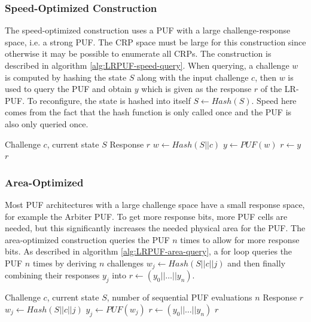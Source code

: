 \subsubsection{Speed-Optimized Construction}
The speed-optimized construction uses a PUF with a large challenge-response space, i.e. a strong PUF. The CRP space must be large for this construction since otherwise it may be possible to enumerate all CRPs. The construction is described in algorithm \ref{alg:LRPUF-speed-query}. When querying, a challenge $w$ is computed by hashing the state $S$ along with the input challenge $c$, then $w$ is used to query the PUF and obtain $y$ which is given as the response $r$ of the LR-PUF. To reconfigure, the state is hashed into itself $S\leftarrow Hash(S)$. Speed here comes from the fact that the hash function is only called once and the PUF is also only queried once. 

\begin{algorithm}[ht!]
\caption{Speed-Optimized $\texttt{query}_S(c)$}
\begin{algorithmic}[1]
    \Require Challenge $c$, current state $S$
    \Ensure Response $r$
    \State $w \leftarrow Hash(S || c)$ 
    \State $y \leftarrow PUF(w)$
    \State $r \leftarrow y$ 
    \State \Return $r$
\end{algorithmic}
\label{alg:LRPUF-speed-query}
\end{algorithm}

\subsubsection{Area-Optimized}
Most PUF architectures with a large challenge space have a small response space, for example the Arbiter PUF. To get more response bits, more PUF cells are needed, but this significantly increases the needed physical area for the PUF. The area-optimized construction queries the PUF $n$ times to allow for more response bits. As described in algorithm \ref{alg:LRPUF-area-query}, a for loop queries the PUF $n$ times by deriving $n$ challenges $w_j \leftarrow Hash(S||c||j)$ and then finally combining their responses $y_j$ into $r \leftarrow (y_0 || \dots || y_n)$.


\begin{algorithm}[ht!]
\caption{Area-Optimized $\texttt{query}_S(c)$}
\begin{algorithmic}[1]
    \Require Challenge $c$, current state $S$, number of sequential PUF evaluations $n$
    \Ensure Response $r$
        \State $w_j \leftarrow Hash(S || c || j)$ 
        \State $y_j \leftarrow PUF(w_j)$
    \EndFor
    \State $r \leftarrow (y_0 || \dots || y_n)$ 
    \State \Return $r$
\end{algorithmic}
\label{alg:LRPUF-area-query}
\end{algorithm} 

